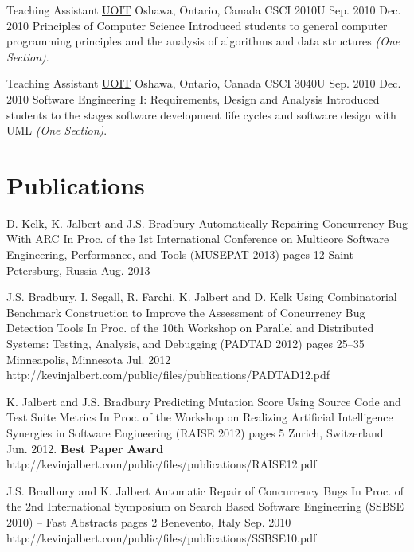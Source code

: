   \teachingEntry
    {Teaching Assistant}
    {\href{http://www.uoit.ca/}{UOIT}}
    {Oshawa, Ontario, Canada}
    {CSCI 2010U}
    {Sep. 2010}
    {Dec. 2010}
    {Principles of Computer Science}
    {Introduced students to general computer programming principles and the analysis of algorithms and data structures \textit{(One Section)}.}

  \teachingEntry
    {Teaching Assistant}
    {\href{http://www.uoit.ca/}{UOIT}}
    {Oshawa, Ontario, Canada}
    {CSCI 3040U}
    {Sep. 2010}
    {Dec. 2010}
    {Software Engineering I: Requirements, Design and Analysis}
    {Introduced students to the stages software development life cycles and software design with UML \textit{(One Section)}.}

  \section{Publications}

  \publicationEntry
    {D. Kelk, K. Jalbert and J.S. Bradbury}
    {Automatically Repairing Concurrency Bug With ARC}
    {In Proc. of the 1st International Conference on Multicore Software Engineering, Performance, and Tools (MUSEPAT 2013)}
    {pages 12}
    {Saint Petersburg, Russia}
    {Aug. 2013}
    {}

  \publicationEntry
    {J.S. Bradbury, I. Segall, R. Farchi, K. Jalbert and D. Kelk}
    {Using Combinatorial Benchmark Construction to Improve the Assessment of Concurrency Bug Detection Tools}
    {In Proc. of the 10th Workshop on Parallel and Distributed Systems: Testing, Analysis, and Debugging (PADTAD 2012)}
    {pages 25--35}
    {Minneapolis, Minnesota}
    {Jul. 2012}
    {http://kevinjalbert.com/public/files/publications/PADTAD12.pdf}

  \publicationEntry
    {K. Jalbert and J.S. Bradbury}
    {Predicting Mutation Score Using Source Code and Test Suite Metrics}
    {In Proc. of the Workshop on Realizing Artificial Intelligence Synergies in Software Engineering (RAISE 2012)}
    {pages 5}
    {Zurich, Switzerland}
    {Jun. 2012. \textbf{Best Paper Award}}
    {http://kevinjalbert.com/public/files/publications/RAISE12.pdf}

  \publicationEntry
    {J.S. Bradbury and K. Jalbert}
    {Automatic Repair of Concurrency Bugs}
    {In Proc. of the 2nd International Symposium on Search Based Software Engineering (SSBSE 2010) -- Fast Abstracts}
    {pages 2}
    {Benevento, Italy}
    {Sep. 2010}
    {http://kevinjalbert.com/public/files/publications/SSBSE10.pdf}


